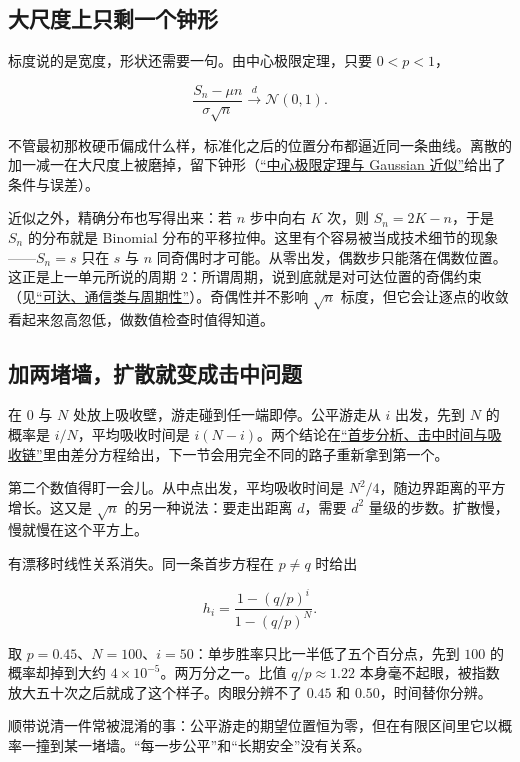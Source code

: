 \subsection{大尺度上只剩一个钟形}

标度说的是宽度，形状还需要一句。由中心极限定理，只要 \(0<p<1\)，

\[
\frac{S_n-\mu n}{\sigma\sqrt n}\xrightarrow{d}\mathcal N(0,1).
\]

不管最初那枚硬币偏成什么样，标准化之后的位置分布都逼近同一条曲线。离散的加一减一在大尺度上被磨掉，留下钟形（\hyperref[sec:05-Probability/08-Limit-Theorems/03]{``中心极限定理与 Gaussian 近似''}给出了条件与误差）。

近似之外，精确分布也写得出来：若 \(n\) 步中向右 \(K\) 次，则 \(S_n=2K-n\)，于是 \(S_n\) 的分布就是 Binomial 分布的平移拉伸。这里有个容易被当成技术细节的现象——\(S_n=s\) 只在 \(s\) 与 \(n\) 同奇偶时才可能。从零出发，偶数步只能落在偶数位置。这正是上一单元所说的周期 \(2\)：所谓周期，说到底就是对可达位置的奇偶约束（见\hyperref[sec:06-Random-Processes/03-Markov-Chains/02]{``可达、通信类与周期性''}）。奇偶性并不影响 \(\sqrt n\) 标度，但它会让逐点的收敛看起来忽高忽低，做数值检查时值得知道。

\subsection{加两堵墙，扩散就变成击中问题}

在 \(0\) 与 \(N\) 处放上吸收壁，游走碰到任一端即停。公平游走从 \(i\) 出发，先到 \(N\) 的概率是 \(i/N\)，平均吸收时间是 \(i(N-i)\)。两个结论在\hyperref[sec:06-Random-Processes/03-Markov-Chains/05]{``首步分析、击中时间与吸收链''}里由差分方程给出，下一节会用完全不同的路子重新拿到第一个。

第二个数值得盯一会儿。从中点出发，平均吸收时间是 \(N^2/4\)，随边界距离的平方增长。这又是 \(\sqrt n\) 的另一种说法：要走出距离 \(d\)，需要 \(d^2\) 量级的步数。扩散慢，慢就慢在这个平方上。

有漂移时线性关系消失。同一条首步方程在 \(p\neq q\) 时给出

\[
h_i=\frac{1-(q/p)^i}{1-(q/p)^N}.
\]

取 \(p=0.45\)、\(N=100\)、\(i=50\)：单步胜率只比一半低了五个百分点，先到 \(100\) 的概率却掉到大约 \(4\times10^{-5}\)。两万分之一。比值 \(q/p\approx1.22\) 本身毫不起眼，被指数放大五十次之后就成了这个样子。肉眼分辨不了 \(0.45\) 和 \(0.50\)，时间替你分辨。

顺带说清一件常被混淆的事：公平游走的期望位置恒为零，但在有限区间里它以概率一撞到某一堵墙。``每一步公平''和``长期安全''没有关系。

